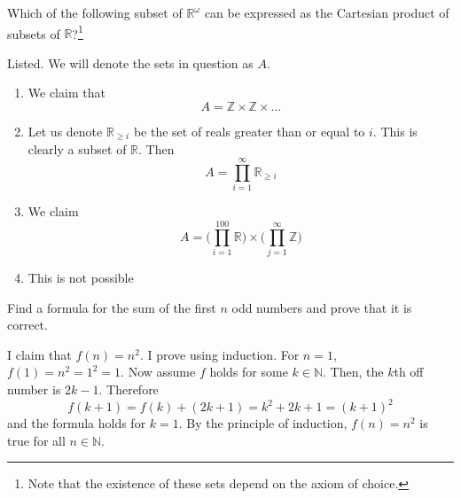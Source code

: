   \begin{exercise} 
    Which of the following subset of $\mathbb{R}^\omega$ can be expressed as the Cartesian product of subsets of $\mathbb{R}$?\footnote{Note that the existence of these sets depend on the axiom of choice.}
  \end{exercise}
  \begin{solution}
    Listed. We will denote the sets in question as $A$. 
    \begin{enumerate}
      \item We claim that 
        \begin{equation}
          A = \mathbb{Z} \times \mathbb{Z} \times \ldots
        \end{equation}
      \item Let us denote $\mathbb{R}_{\geq i}$ be the set of reals greater than or equal to $i$. This is clearly a subset of $\mathbb{R}$. Then 
        \begin{equation}
          A = \prod_{i=1}^\infty \mathbb{R}_{\geq i}
        \end{equation}
      \item We claim 
        \begin{equation}
          A = \bigg( \prod_{i=1}^{100} \mathbb{R} \bigg) \times \bigg( \prod_{j=1}^\infty \mathbb{Z} \bigg)
        \end{equation}
      \item This is not possible
    \end{enumerate}
  \end{solution}

  \begin{exercise}
    Find a formula for the sum of the first $n$ odd numbers and prove that it is correct.
  \end{exercise}
  \begin{solution}
    I claim that $f(n) = n^2$. I prove using induction. For $n = 1$, $f(1) = n^2 = 1^2 = 1$. Now assume $f$ holds for some $k \in \mathbb{N}$. Then, the $k$th off number is $2k-1$. Therefore 
    \begin{equation}
      f(k+1) = f(k) + (2k + 1) = k^2 + 2k + 1 = (k + 1)^2
    \end{equation}
    and the formula holds for $k=1$. By the principle of induction, $f(n) = n^2$ is true for all $n \in \mathbb{N}$. 
  \end{solution}

